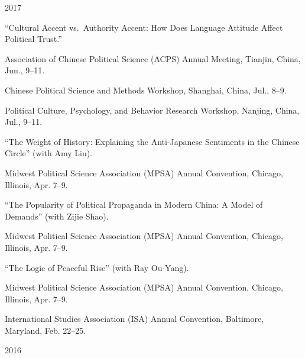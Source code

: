 \documentclass[10.5pt,]{article}
\providecommand{\tightlist}{%
	\setlength{\itemsep}{0pt}\setlength{\parskip}{0pt}}
\renewenvironment{itemize}{
	\begin{list}{}{
			\setlength{\leftmargin}{1.5em}
		}
	}{
	\end{list}
}
\begin{document}
\begin{itemize}
\tightlist
\item
  2017

  \begin{itemize}
  \tightlist
  \item
    ``Cultural Accent vs.~Authority Accent: How Does Language Attitude
    Affect Political Trust.''

    \begin{itemize}
    \tightlist
    \item
      \footnotesize Association of Chinese Political Science (ACPS)
      Annual Meeting, Tianjin, China, Jun., 9--11.
    \item
      \footnotesize Chinese Political Science and Methods Workshop,
      Shanghai, China, Jul., 8--9.
    \item
      \footnotesize Political Culture, Psychology, and Behavior Research
      Workshop, Nanjing, China, Jul., 9--11.
    \end{itemize}
  \item
    ``The Weight of History: Explaining the Anti-Japanese Sentiments in
    the Chinese Circle'' (with Amy Liu).

    \begin{itemize}
    \tightlist
    \item
      \footnotesize Midwest Political Science Association (MPSA) Annual
      Convention, Chicago, Illinois, Apr. 7--9.
    \end{itemize}
  \item
    ``The Popularity of Political Propaganda in Modern China: A Model of
    Demands'' (with Zijie Shao).

    \begin{itemize}
    \tightlist
    \item
      \footnotesize Midwest Political Science Association (MPSA) Annual
      Convention, Chicago, Illinois, Apr. 7--9.
    \end{itemize}
  \item
    ``The Logic of Peaceful Rise'' (with Ray Ou-Yang).

    \begin{itemize}
    \tightlist
    \item
      \footnotesize Midwest Political Science Association (MPSA) Annual
      Convention, Chicago, Illinois, Apr. 7--9.
    \item
      \footnotesize International Studies Association (ISA) Annual
      Convention, Baltimore, Maryland, Feb. 22--25.
    \end{itemize}
  \end{itemize}
\item
  2016


\end{itemize}
\end{document}
